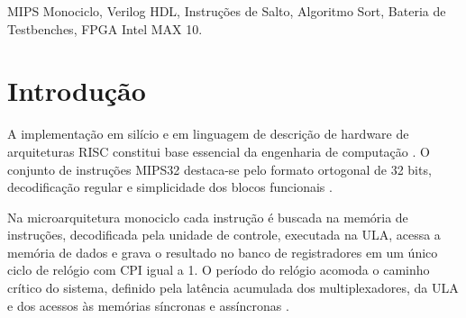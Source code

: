 \begin{abstract}
Este artigo apresenta o projeto, a modelagem em Verilog HDL parametrizado conforme a norma IEEE Std 1364-2005, a síntese lógica em FPGA Intel MAX 10 e a validação funcional de um processador MIPS Monociclo de 32 bits com arquitetura Harvard. O caminho de dados foi projetado para executar fluxos sequenciais, desvios condicionais \texttt{beq} e \texttt{bne}, e saltos incondicionais e de sub-rotina \texttt{j}, \texttt{jal} e \texttt{jr} em um único ciclo de relógio. A homologação da microarquitetura ocorreu sob a carga real do algoritmo de ordenação de vetores \texttt{sort.bin}, montado pelo simulador MARS. Para viabilizar a execução do binário sem qualquer alteração no código de máquina, o hardware recebeu uma máscara combinacional de endereçamento na memória ROM através do barramento \texttt{addr[9:2]} e um inicializador de registradores no momento do reset. A metodologia de validação compreendeu uma suíte automatizada de 7 bancadas de teste em Icarus Verilog com 100\% de taxa de aprovação e ordenação na memória RAM. A síntese lógica no Intel Quartus Prime alcançou zero erros de elaboração para a placa Terasic DE10-Lite.
\end{abstract}

\begin{IEEEkeywords}
MIPS Monociclo, Verilog HDL, Instruções de Salto, Algoritmo Sort, Bateria de Testbenches, FPGA Intel MAX 10.
\end{IEEEkeywords}

\section{Introdução}

A implementação em silício e em linguagem de descrição de hardware de arquiteturas RISC constitui base essencial da engenharia de computação \cite{patterson_mips}. O conjunto de instruções MIPS32 destaca-se pelo formato ortogonal de 32 bits, decodificação regular e simplicidade dos blocos funcionais \cite{harris_harris_2013, brito_instrucoes}.

Na microarquitetura monociclo cada instrução é buscada na memória de instruções, decodificada pela unidade de controle, executada na ULA, acessa a memória de dados e grava o resultado no banco de registradores em um único ciclo de relógio com CPI igual a 1. O período do relógio acomoda o caminho crítico do sistema, definido pela latência acumulada dos multiplexadores, da ULA e dos acessos às memórias síncronas e assíncronas \cite{patterson_mips}.

